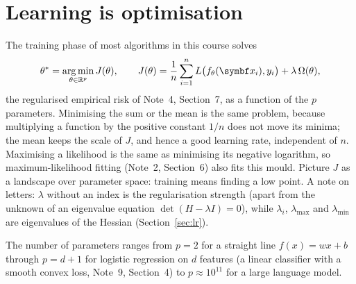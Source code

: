 \documentclass[11pt]{article}
\begin{document}

\section{Learning is optimisation}\label{sec:problem}

The training phase of most algorithms in this course solves
\[
  \theta^* = \argmin_{\theta \in \R^p} J(\theta), \qquad
  J(\theta) = \frac1n \sum_{i=1}^n L\big(f_\theta(\x_i), y_i\big) + \lambda\,\Omega(\theta),
\]
the regularised empirical risk of Note~4, Section~7, as a function of the $p$ parameters. Minimising the sum or the
mean is the same problem, because multiplying a function by the positive constant $1/n$ does not move its minima; the
mean keeps the scale of $J$, and hence a good learning rate, independent of $n$. Maximising a likelihood is the same
as minimising its negative logarithm, so maximum-likelihood fitting (Note~2, Section~6) also fits this mould. Picture $J$
as a landscape over parameter space: training means finding a low point. A note on letters: $\lambda$ without an
index is the regularisation strength (apart from the unknown of an eigenvalue equation $\det(H - \lambda I) = 0$), while $\lambda_i$, $\lambda_{\max}$ and $\lambda_{\min}$ are eigenvalues
of the Hessian (Section~\ref{sec:lr}).

The number of parameters ranges from $p = 2$ for a straight line $f(x) = wx + b$ through $p = d + 1$ for logistic
regression on $d$ features (a linear classifier with a smooth convex loss, Note~9, Section~4) to $p \approx 10^{11}$ for a large language model.
\end{document}
